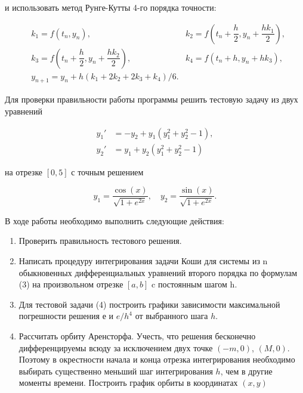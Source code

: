 \documentclass[a4paper,12pt]{article}
\begin{document}
{и использовать метод Рунге-Кутты 4-го порядка точности:

\begin{equation}
    \begin{aligned}
		&k_1 = f(t_n, y_n), \quad &k_2 = f\left(t_n + \dfrac{h}{2}, y_n + \dfrac{h k_1}{2}\right), \\
		&k_3 = f\left(t_n + \dfrac{h}{2}, y_n + \dfrac{h k_2}{2}\right), \quad &k_4 = f\left(t_n + h, y_n + h k_3\right), \\
		&y_{n+1} = y_n + h (k_1 + 2k_2 + 2k_3 + k_4)/6.
    \end{aligned}
	\label{3}
\end{equation}


Для проверки правильности работы программы решить тестовую задачу из двух уравнений

\begin{equation}
	\begin{aligned}
	y_1'& = -y_2 + y_1 (y_1^2 + y_2^2 - 1), \\
	y_2'& = y_1 + y_2 (y_1^2 + y_2^2 - 1)
	\end{aligned}
	\label{4}
\end{equation}

на отрезке $[0, 5]$ с точным решением

$$
y_1 = \dfrac{\cos(x)}{\sqrt{1 + e^{2x}}}, \quad y_2 = \dfrac{\sin(x)}{\sqrt{1 + e^{2x}}}.
$$

\clearpage

В ходе работы необходимо выполнить следующие действия:
	
\begin{enumerate}
\item Проверить правильность тестового решения.
\item Написать процедуру интегрирования задачи Коши для системы из $\mathrm{n}$ обыкновенных дифференциальных уравнений второго порядка по формулам (3) на произвольном отрезке $[a, b]$ c постоянным шагом $\mathrm{h}$.
\item Для тестовой задачи (4) построить графики зависимости максимальной погрешности решения е и $e / h^4$ от выбранного шага $h$.
\item Рассчитать орбиту Аренсторфа. Учесть, что решения бесконечно дифференцируемы всюду за исключением двух точке $(-m,0)$, $(M,0)$. Поэтому в окрестности начала и конца отрезка интегрирования необходимо выбирать существенно меньший шаг инте\-гри\-ро\-вания $h$, чем в другие моменты времени. Построить график орбиты в координатах $(x,y)$
\end{enumerate}

}
\end{document}
